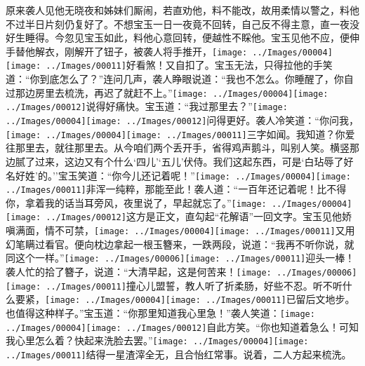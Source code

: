 {原来袭人见他无晓夜和姊妹们厮闹，若直劝他，料不能改，故用柔情以警之，料他不过半日片刻仍复好了。不想宝玉一日一夜竟不回转，自己反不得主意，直一夜没好生睡得。今忽见宝玉如此，料他心意回转，便越性不睬他。宝玉见他不应，便伸手替他解衣，刚解开了钮子，被袭人将手推开，{\texttt{[image: ../Images/00004]}\texttt{[image: ../Images/00011]}\footnotesize \kaishu 好看煞！}又自扣了。宝玉无法，只得拉他的手笑道：``你到底怎么了？''连问几声，袭人睁眼说道：``我也不怎么。你睡醒了，你自过那边房里去梳洗，再迟了就赶不上。''{\texttt{[image: ../Images/00004]}\texttt{[image: ../Images/00012]}\footnotesize \kaishu 说得好痛快。}宝玉道：``我过那里去？''{\texttt{[image: ../Images/00004]}\texttt{[image: ../Images/00012]}\footnotesize \kaishu 问得更好。}袭人冷笑道：``你问我，{\texttt{[image: ../Images/00004]}\texttt{[image: ../Images/00011]}\footnotesize \kaishu 三字如闻。}我知道？你爱往那里去，就往那里去。从今咱们两个丢开手，省得鸡声鹅斗，叫别人笑。横竖那边腻了过来，这边又有个什么`四儿'`五儿'伏侍。我们这起东西，可是`白玷辱了好名好姓'的。''宝玉笑道：``你今儿还记着呢！''{\texttt{[image: ../Images/00004]}\texttt{[image: ../Images/00011]}\footnotesize \kaishu 非浑一纯粹，那能至此！}袭人道：``一百年还记着呢！比不得你，拿着我的话当耳旁风，夜里说了，早起就忘了。''{\texttt{[image: ../Images/00004]}\texttt{[image: ../Images/00012]}\footnotesize \kaishu 这方是正文，直勾起``花解语''一回文字。}宝玉见他娇嗔满面，情不可禁，{\texttt{[image: ../Images/00004]}\texttt{[image: ../Images/00011]}\footnotesize \kaishu 又用幻笔瞒过看官。}便向枕边拿起一根玉簪来，一跌两段，说道：``我再不听你说，就同这个一样。''{\texttt{[image: ../Images/00006]}\texttt{[image: ../Images/00011]}\footnotesize \kaishu 迎头一棒！}袭人忙的拾了簪子，说道：``大清早起，这是何苦来！{\texttt{[image: ../Images/00006]}\texttt{[image: ../Images/00011]}\footnotesize \kaishu 撞心儿盟誓，教人听了折柔肠，好些不忍。}听不听什么要紧，{\texttt{[image: ../Images/00004]}\texttt{[image: ../Images/00011]}\footnotesize \kaishu 已留后文地步。}也值得这种样子。''宝玉道：``你那里知道我心里急！''袭人笑道：{\texttt{[image: ../Images/00004]}\texttt{[image: ../Images/00012]}\footnotesize \kaishu 自此方笑。}``你也知道着急么！可知我心里怎么着？快起来洗脸去罢。''{\texttt{[image: ../Images/00004]}\texttt{[image: ../Images/00011]}\footnotesize \kaishu 结得一星渣滓全无，且合怡红常事。}说着，二人方起来梳洗。

}
